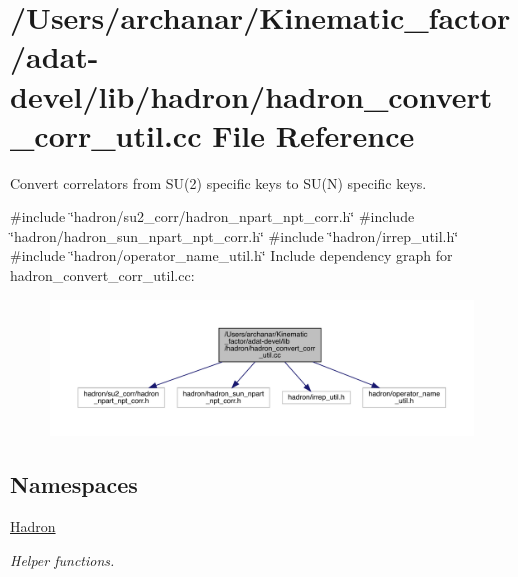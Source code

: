 \hypertarget{adat-devel_2lib_2hadron_2hadron__convert__corr__util_8cc}{}\section{/\+Users/archanar/\+Kinematic\+\_\+factor/adat-\/devel/lib/hadron/hadron\+\_\+convert\+\_\+corr\+\_\+util.cc File Reference}
\label{adat-devel_2lib_2hadron_2hadron__convert__corr__util_8cc}


Convert correlators from S\+U(2) specific keys to S\+U(\+N) specific keys.  


{\ttfamily \#include \char`\"{}hadron/su2\+\_\+corr/hadron\+\_\+npart\+\_\+npt\+\_\+corr.\+h\char`\"{}}\newline
{\ttfamily \#include \char`\"{}hadron/hadron\+\_\+sun\+\_\+npart\+\_\+npt\+\_\+corr.\+h\char`\"{}}\newline
{\ttfamily \#include \char`\"{}hadron/irrep\+\_\+util.\+h\char`\"{}}\newline
{\ttfamily \#include \char`\"{}hadron/operator\+\_\+name\+\_\+util.\+h\char`\"{}}\newline
Include dependency graph for hadron\+\_\+convert\+\_\+corr\+\_\+util.\+cc\+:
\nopagebreak
\begin{figure}[H]
\begin{center}
\leavevmode
\includegraphics[width=350pt]{d8/da8/adat-devel_2lib_2hadron_2hadron__convert__corr__util_8cc__incl}
\end{center}
\end{figure}
\subsection*{Namespaces}
\begin{DoxyCompactItemize}
\item 
 \mbox{\hyperlink{namespaceHadron}{Hadron}}
\begin{DoxyCompactList}\small\item\em Helper functions. \end{DoxyCompactList}\end{DoxyCompactItemize}

